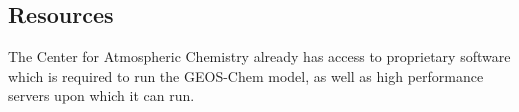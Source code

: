 \subsection{Resources}

The Center for Atmospheric Chemistry already has access to proprietary software which is required to run the GEOS-Chem model, as well as high performance servers upon which it can run.